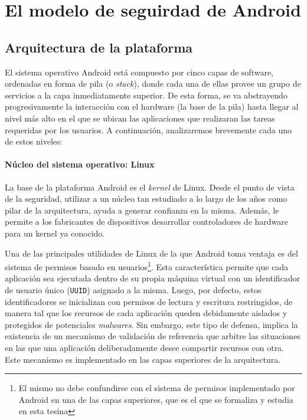 \chapter{El modelo de seguirdad de Android}
\label{chapter:background}

\section{Arquitectura de la plataforma}
\label{section:architecture}

El sistema operativo Android está compuesto por cinco capas de software, ordenadas en forma de pila (o
\textit{stack}), donde cada una de ellas provee un grupo de servicios a la capa inmediatamente
superior. De esta forma, se va abstrayendo progresivamente la interacción con el hardware (la base de
la pila) hasta llegar al nivel más alto en el que se ubican las aplicaciones que realizaran las tareas
requeridas por los usuarios. A continuación, analizaremos brevemente cada uno de estos niveles:

\subsubsection*{Núcleo del sistema operativo: Linux}
\label{section:architecture:kernel}
La base de la plataforma Android es el \textit{kernel} de Linux. Desde el punto de vista de la
seguridad, utilizar a un núcleo tan estudiado a lo largo de los años como pilar de la arquitectura,
ayuda a generar confianza en la misma. Además, le permite a los fabricantes de dispositivos
desarrollar controladores de hardware para un kernel ya conocido.

Una de las principales utilidades de Linux de la que Android toma ventaja es del sistema de permisos
basado en usuarios\footnote{El mismo no debe confundirse con el sistema de permisos implementado por
    Android en una de las capas superiores, que es el que se formaliza y estudia en esta tesina}. Esta
característica permite que cada aplicación sea ejecutada dentro de su propia máquina virtual con un
identificador de usuario único (\texttt{UUID}) asignado a la misma. Luego, por defecto, estos
identificadores se inicializan con permisos de lectura y escritura restringidos, de manera tal que los
recursos de cada aplicación queden debidamente aislados y protegidos de potenciales \textit{malwares}.
Sin embargo, este tipo de defensa, implica la existencia de un mecanismo de validación de referencia
que arbitre las situaciones en las que una aplicación deliberadamente desee compartir recursos con
otra. Este mecanismo es implementado en las capas superiores de la arquitectura.

